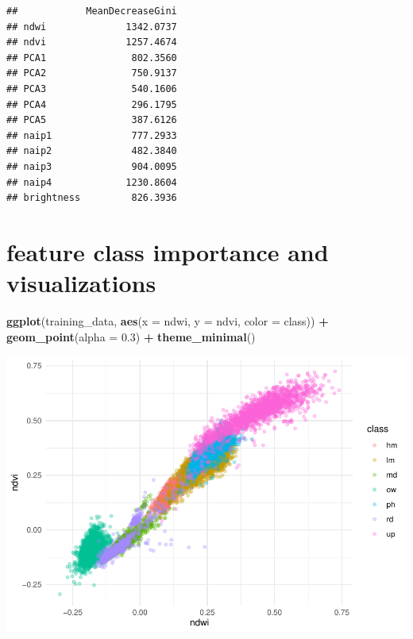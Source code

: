 \documentclass[
]{article}
\newenvironment{Shaded}{\begin{snugshade}}{\end{snugshade}}
\newcommand{\AttributeTok}[1]{\textcolor[rgb]{0.13,0.29,0.53}{#1}}
\newcommand{\CommentTok}[1]{\textcolor[rgb]{0.56,0.35,0.01}{\textit{#1}}}
\newcommand{\FloatTok}[1]{\textcolor[rgb]{0.00,0.00,0.81}{#1}}
\newcommand{\FunctionTok}[1]{\textcolor[rgb]{0.13,0.29,0.53}{\textbf{#1}}}
\newcommand{\NormalTok}[1]{#1}
\newcommand{\SpecialCharTok}[1]{\textcolor[rgb]{0.81,0.36,0.00}{\textbf{#1}}}
\begin{document}
\begin{Shaded}
\end{Shaded}

\begin{verbatim}
##            MeanDecreaseGini
## ndwi              1342.0737
## ndvi              1257.4674
## PCA1               802.3560
## PCA2               750.9137
## PCA3               540.1606
## PCA4               296.1795
## PCA5               387.6126
## naip1              777.2933
## naip2              482.3840
## naip3              904.0095
## naip4             1230.8604
## brightness         826.3936
\end{verbatim}

\section{feature class importance and
visualizations}\label{feature-class-importance-and-visualizations}

\begin{Shaded}
\begin{Highlighting}[]
\FunctionTok{ggplot}\NormalTok{(training\_data, }\FunctionTok{aes}\NormalTok{(}\AttributeTok{x =}\NormalTok{ ndwi, }\AttributeTok{y =}\NormalTok{ ndvi, }\AttributeTok{color =}\NormalTok{ class)) }\SpecialCharTok{+}
  \FunctionTok{geom\_point}\NormalTok{(}\AttributeTok{alpha =} \FloatTok{0.3}\NormalTok{) }\SpecialCharTok{+}
  \FunctionTok{theme\_minimal}\NormalTok{()}
\end{Highlighting}
\end{Shaded}

\includegraphics{veg_model_new_class_files/figure-latex/unnamed-chunk-5-1.pdf}
\end{document}
